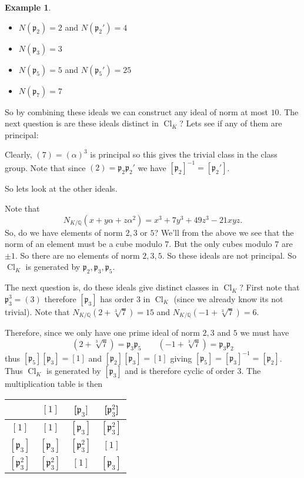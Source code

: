 \documentclass[11pt,a4paper]{report}
\theoremstyle{plain}
\theoremstyle{definition}
\newtheorem{exmp}[subsection]{Example}
\theoremstyle{definition}
\def\QQ{\mathbb{Q}}
\def\gothp{\mathfrak{p}}
\def \a{\alpha}
\DeclareMathOperator{\Cl}{Cl}
\begin{document}
\begin{exmp}
		\begin{itemize}
			\item $N(\gothp_2)=2$ and $N(\gothp_2')=4$
			\item $N(\gothp_3)=3$ 
			\item $N(\gothp_5)=5$ and $N(\gothp_5')=25$
			\item $N(\gothp_7)=7$
		\end{itemize}
		
		So by combining these ideals we can construct any ideal of norm at most $10$. The next question is are these ideals distinct in $\Cl_K$? Lets see if any of them are principal:
		
		Clearly, $(7)=(\a)^3$ is principal so this gives the trivial class in the class group. Note that since $(2)=\gothp_2\gothp_2'$ we have $[\gothp_2]^{-1}=[\gothp_2']$.
		
		So lets look at the other ideals.
		
		Note that \[N_{K/\QQ}(x+y\a+z\a^2)=x^3+7y^3+49z^3-21xyz.\] So, do we have elements of norm $2,3$ or $5$? We'll from the above we see that the norm of an element must be a cube modulo $7$. But the only cubes modulo $7$ are $\pm 1$. So there are no elements of norm $2,3,5$. So these ideals are not principal. So $\Cl_K$ is generated by $\gothp_{2},\gothp_3,\gothp_5$.
		
		The next question is, do these ideals give distinct classes in $\Cl_K$? First note that $\gothp_3^3=(3)$ therefore $[\gothp_3]$ has order $3$ in $\Cl_K$ (since we already know its not trivial). Note that $N_{K/\QQ}(2+\sqrt[3]{7})=15$ and $N_{K/\QQ}(-1+\sqrt[3]{7})=6$.
		
		Therefore, since we only have one prime ideal of norm $2,3$ and $5$ we must have \[(2+\sqrt[3]{7})=\gothp_3\gothp_5 \qquad (-1+\sqrt[3]{7})=\gothp_3\gothp_2 \] thus $[\gothp_5][\gothp_3]=[1]$ and $[\gothp_{2}][\gothp_3]=[1]$ giving $[\gothp_5]=[\gothp_3]^{-1}=[\gothp_2]$. Thus $\Cl_K$ is generated by $[\gothp_3]$ and is therefore cyclic of order $3$. The multiplication table is then
		
		
		\begin{center}
			\begin{tabular} {|c| c c c |}
				\hline
				&$[1]$&[$\gothp_3]$&[$\gothp_3^2$]\\
				\hline
				$[1]$&$[1]$&$[\gothp_3]$&$[\gothp_3^2]$\\
				$[\gothp_3]$&$[\gothp_3] $& $[\gothp_3^2]$&$[1]$\\
				$[\gothp_3^2]$&$[\gothp_3^2]$&$[1]$&$[\gothp_3]$\\
				\hline
			\end{tabular}
		\end{center}
		
		
	\end{exmp}
	
\end{document}
